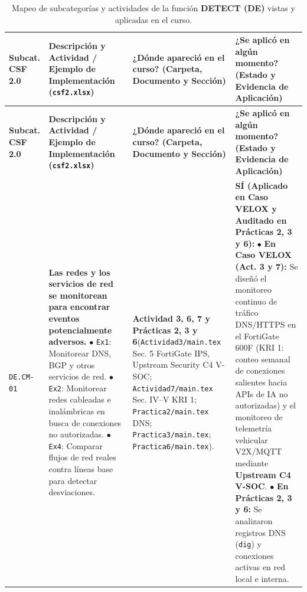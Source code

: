 \documentclass[letterpaper,11pt]{article}
\begin{document}
\begingroup
\scriptsize
\setlength{\tabcolsep}{3.5pt}
\renewcommand{\arraystretch}{1.24}
\begin{longtable}{|C{1.5cm}|L{5.3cm}|L{4.3cm}|L{5.8cm}|}
\caption{Mapeo de subcategorías y actividades de la función \textbf{DETECT (DE)} vistas y aplicadas en el curso.}
\label{tab:mapeo-de} \\
\hline
{}
\textbf{Subcat. CSF 2.0} & \textbf{Descripción y Actividad / Ejemplo de Implementación (\texttt{csf2.xlsx})} & \textbf{¿Dónde apareció en el curso? (Carpeta, Documento y Sección)} & \textbf{¿Se aplicó en algún momento? (Estado y Evidencia de Aplicación)} \\
\hline
\endfirsthead
\hline
{}
\textbf{Subcat. CSF 2.0} & \textbf{Descripción y Actividad / Ejemplo de Implementación (\texttt{csf2.xlsx})} & \textbf{¿Dónde apareció en el curso? (Carpeta, Documento y Sección)} & \textbf{¿Se aplicó en algún momento? (Estado y Evidencia de Aplicación)} \\
\hline
\endhead
\hline
\endfoot

\texttt{DE.CM-01} &
\textbf{Las redes y los servicios de red se monitorean para encontrar eventos potencialmente adversos.}\newline
$\bullet$ \texttt{Ex1}: Monitorear DNS, BGP y otros servicios de red.\newline
$\bullet$ \texttt{Ex2}: Monitorear redes cableadas e inalámbricas en busca de conexiones no autorizadas.\newline
$\bullet$ \texttt{Ex4}: Comparar flujos de red reales contra líneas base para detectar desviaciones. &
\textbf{Actividad 3, 6, 7 y Prácticas 2, 3 y 6}\newline (\texttt{Actividad3/main.tex} Sec. 5 FortiGate IPS, Upstream Security C4 V-SOC; \texttt{Actividad7/main.tex} Sec. IV--V KRI 1; \texttt{Practica2/main.tex} DNS; \texttt{Practica3/main.tex}; \texttt{Practica6/main.tex}). &
\textbf{SÍ (Aplicado en Caso VELOX y Auditado en Prácticas 2, 3 y 6):}\newline
$\bullet$ \textbf{En Caso VELOX (Act. 3 y 7):} Se diseñó el monitoreo continuo de tráfico DNS/HTTPS en el FortiGate 600F (KRI 1: conteo semanal de conexiones salientes hacia APIs de IA no autorizadas) y el monitoreo de telemetría vehicular V2X/MQTT mediante \textbf{Upstream C4 V-SOC}.\newline
$\bullet$ \textbf{En Prácticas 2, 3 y 6:} Se analizaron registros DNS (\texttt{dig}) y conexiones activas en red local e interna. \\
\hline


\end{longtable}
\end{document}
